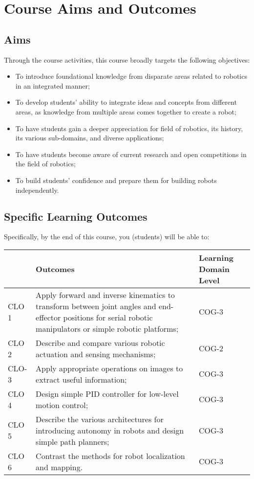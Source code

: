 \documentclass[a4paper]{article}
\begin{document}
\section{Course Aims and Outcomes}
\subsection{Aims}
Through the course activities, this course broadly targets the following objectives:
\begin{itemize}
	\item To introduce foundational knowledge from disparate areas related to robotics in an integrated manner;
	\item To develop students' ability to integrate ideas and concepts from different areas, as knowledge from multiple areas comes together to create a robot;
	\item To have students gain a deeper appreciation for field of robotics, its history, its various sub-domains, and diverse applications;
	\item To have students become aware of current research and open competitions in the field of robotics;
	\item To build students' confidence and prepare them for building robots independently.
\end{itemize}

\subsection{Specific Learning Outcomes}
Specifically, by the end of this course, you (students) will be able to:\\

\renewcommand{\arraystretch}{2}
\begin{tabular}[]{|m{}|m{}|m{}|}
\hline
& \textbf{Outcomes} & \textbf{Learning Domain Level} \\
\hline\hline
CLO 1 & Apply forward and inverse kinematics to transform between joint angles and end-effector positions for serial robotic manipulators or simple robotic platforms; & COG-3 \\\hline
CLO 2 & Describe and compare various robotic actuation and sensing mechanisms; & COG-2\\\hline
CLO-3 & Apply appropriate operations on images to extract useful information; & COG-3\\\hline
CLO 4 & Design simple PID controller for low-level motion control; & COG-3 \\\hline
CLO 5 & Describe the various architectures for introducing autonomy in robots and design simple path planners; & COG-3\\\hline
CLO 6 & Contrast the methods for robot localization and mapping. & COG-3\\\hline
\end{tabular}
	
\end{document}
